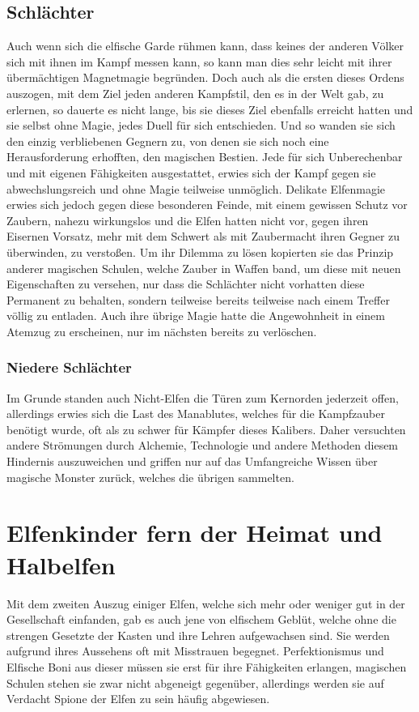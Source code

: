 \documentclass[a4paper,12pt,oneside]{book}
\begin{document}
\section{Schlächter}
Auch wenn sich die elfische Garde rühmen kann, dass keines der anderen Völker sich mit ihnen im Kampf messen kann, so kann man dies sehr leicht mit ihrer übermächtigen Magnetmagie begründen. Doch auch als die ersten dieses Ordens auszogen, mit dem Ziel jeden anderen Kampfstil, den es in der Welt gab, zu erlernen, so dauerte es nicht lange, bis sie dieses Ziel ebenfalls erreicht hatten und sie selbst ohne Magie, jedes Duell für sich entschieden. Und so wanden sie sich den einzig verbliebenen Gegnern zu, von denen sie sich noch eine Herausforderung erhofften, den magischen Bestien. Jede für sich Unberechenbar und mit eigenen Fähigkeiten ausgestattet, erwies sich der Kampf gegen sie abwechslungsreich und ohne Magie teilweise unmöglich. Delikate Elfenmagie erwies sich jedoch gegen diese besonderen Feinde, mit einem gewissen Schutz vor Zaubern, nahezu wirkungslos und die Elfen hatten nicht vor, gegen ihren Eisernen Vorsatz, mehr mit dem Schwert als mit Zaubermacht ihren Gegner zu überwinden, zu verstoßen. Um ihr Dilemma zu lösen kopierten sie das Prinzip anderer magischen Schulen, welche Zauber in Waffen band, um diese mit neuen Eigenschaften zu versehen, nur dass die Schlächter nicht vorhatten diese Permanent zu behalten, sondern teilweise bereits teilweise nach einem Treffer völlig zu entladen. Auch ihre übrige Magie hatte die Angewohnheit in einem Atemzug zu erscheinen, nur im nächsten bereits zu verlöschen.
\subsection{Niedere Schlächter}
Im Grunde standen auch Nicht-Elfen die Türen zum Kernorden jederzeit offen, allerdings erwies sich die Last des Manablutes, welches für die Kampfzauber benötigt wurde, oft als zu schwer für Kämpfer dieses Kalibers. Daher versuchten andere Strömungen durch Alchemie, Technologie und andere Methoden diesem Hindernis auszuweichen und griffen nur auf das Umfangreiche Wissen über magische Monster zurück, welches die übrigen sammelten. 

\chapter{Elfenkinder fern der Heimat und Halbelfen}
Mit dem zweiten Auszug einiger Elfen, welche sich mehr oder weniger gut in der Gesellschaft einfanden, gab es auch jene von elfischem Geblüt, welche ohne die strengen Gesetzte der Kasten und ihre Lehren aufgewachsen sind. Sie werden aufgrund ihres Aussehens oft mit Misstrauen begegnet. Perfektionismus und Elfische Boni aus dieser müssen sie erst für ihre Fähigkeiten erlangen, magischen Schulen stehen sie zwar nicht abgeneigt gegenüber, allerdings werden sie auf Verdacht Spione der Elfen zu sein häufig abgewiesen.
\end{document}
